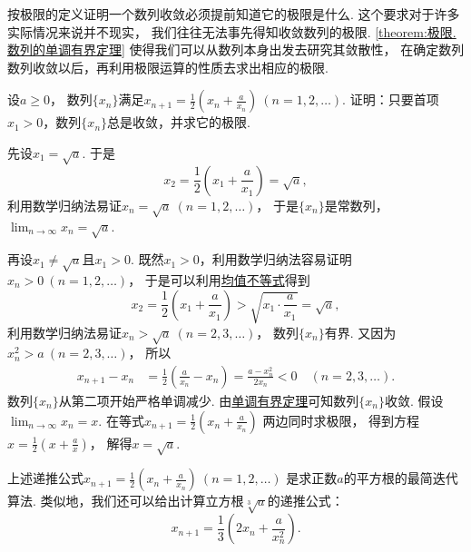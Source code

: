 按极限的定义证明一个数列收敛必须提前知道它的极限是什么.
这个要求对于许多实际情况来说并不现实，
我们往往无法事先得知收敛数列的极限.
\cref{theorem:极限.数列的单调有界定理} 使得我们可以从数列本身出发去研究其敛散性，
在确定数列数列收敛以后，再利用极限运算的性质去求出相应的极限.

\begin{example}\label{example:收敛准则.迭代法计算开平方}
设\(a\geq0\)，
数列\(\{x_n\}\)满足\(x_{n+1} = \frac12\left(x_n+\frac{a}{x_n}\right)\ (n=1,2,\dotsc)\).
证明：只要首项\(x_1>0\)，数列\(\{x_n\}\)总是收敛，并求它的极限.
\begin{solution}
先设\(x_1=\sqrt{a}\).
于是\begin{equation*}
	x_2 = \frac12 \left(x_1+\frac{a}{x_1}\right)
	= \sqrt{a},
\end{equation*}
利用数学归纳法易证\(x_n = \sqrt{a}\ (n=1,2,\dotsc)\)，
于是\(\{x_n\}\)是常数列，
\(\lim_{n\to\infty} x_n = \sqrt{a}\).

再设\(x_1\neq\sqrt{a}\)且\(x_1>0\).
既然\(x_1>0\)，利用数学归纳法容易证明\(x_n>0\ (n=1,2,\dotsc)\)，
于是可以利用\hyperref[theorem:不等式.基本不等式2推论1]{均值不等式}得到\begin{equation*}
	x_2
	= \frac12\left(x_1+\frac{a}{x_1}\right)
	> \sqrt{x_1 \cdot \frac{a}{x_1}}
	= \sqrt{a},
\end{equation*}
利用数学归纳法易证\(x_n > \sqrt{a}\ (n=2,3,\dotsc)\)，
数列\(\{x_n\}\)有界.
又因为\(x_n^2 > a\ (n=2,3,\dotsc)\)，
所以\begin{align*}
	x_{n+1}-x_n
	&= \frac12 \left(\frac{a}{x_n}-x_n\right)
	= \frac{a-x_n^2}{2x_n}
	< 0
	\quad(n=2,3,\dotsc).
\end{align*}
数列\(\{x_n\}\)从第二项开始严格单调减少.
由\hyperref[theorem:极限.数列的单调有界定理]{单调有界定理}可知数列\(\{x_n\}\)收敛.
假设\(\lim_{n\to\infty} x_n = x\).
在等式\(x_{n+1} = \frac12\left(x_n+\frac{a}{x_n}\right)\)
两边同时求极限，
得到方程\(x = \frac12\left(x+\frac{a}{x}\right)\)，
解得\(x = \sqrt{a}\).
\end{solution}
\end{example}
\begin{remark}
上述递推公式\(x_{n+1} = \frac12\left(x_n+\frac{a}{x_n}\right)\ (n=1,2,\dotsc)\)
是求正数\(a\)的平方根的最简迭代算法.
类似地，我们还可以给出计算立方根\(\sqrt[3]{a}\)的递推公式：\begin{equation*}
	x_{n+1} = \frac13 \left( 2 x_n + \frac{a}{x_n^2} \right).
\end{equation*}
\end{remark}

